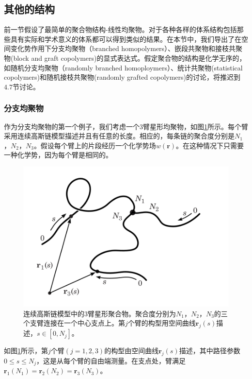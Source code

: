 \subsection{其他的结构}
前一节假设了最简单的聚合物结构-线性均聚物。对于各种各样的体系结构包括那些具有实际和学术意义的体系都可以得到类似的结果。在本节中，我们导出了在空间变化势作用下分支均聚物（branched homopolymers）、嵌段共聚物和接枝共聚物(block and graft copolymers)的显式表达式。假定聚合物的结构是化学无序的，如随机分支均聚物（randomly branched homoploymers）、统计共聚物(statistical copolymers)和随机接枝共聚物(randomly grafted copolymers)的讨论，将推迟到$4.7$节讨论。
\subsubsection{分支均聚物}
作为分支均聚物的第一个例子，我们考虑一个$3$臂星形均聚物，如图\ref{三臂星形均聚物}所示。每个臂采用连续高斯链模型描述并且有任意的长度。相应的，每条链的聚合度分别是$N_1$，$N_2$，$N_3$。假设每个臂上的片段经历一个化学势场$w (\mathbf{r})$。在这种情况下只需要一种化学势，因为每个臂是相同的。
\begin{figure}[H]
\centering
\includegraphics[scale=0.7]{./figures/34.png}
\caption{连续高斯链模型中的$3$臂星形聚合物。聚合度分别为$N_1$，$N_2$，$N_3$的三个支臂连接在一个中心支点上。第$j$个臂的构型用空间曲线$\mathbf{r}_j(s)$描述，$s\in [0,N_j]$。}
\label{三臂星形均聚物}
\end{figure}

如图\ref{三臂星形均聚物}所示，第$j$个臂$(j=1,2,3)$的构型由空间曲线$\mathbf{r}_j(s)$描述，其中路径参数$0\leq s\leq N_j$，这是从每个臂的自由端测量。在支点处，臂满足$\mathbf{r}_1(N_1)=\mathbf{r}_2(N_2)=\mathbf{r}_3(N_3)$。

